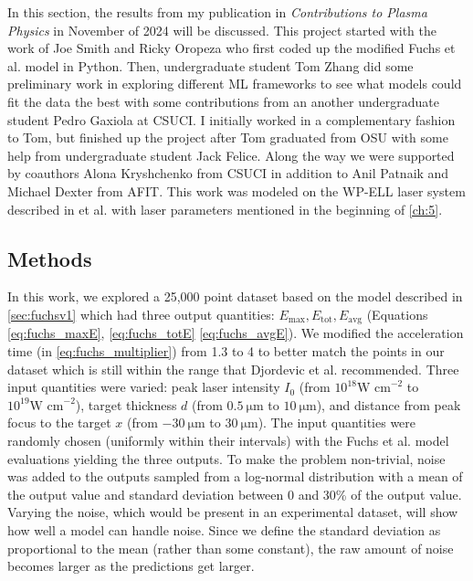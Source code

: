 In this section, the results from my publication in \emph{Contributions to Plasma Physics} \cite{Desai_2024_CPP} in November of 2024 will be discussed. This project started with the work of Joe Smith and Ricky Oropeza who first coded up the modified Fuchs et al. model in Python. Then, undergraduate student Tom Zhang did some preliminary work in exploring different \gls{ML} frameworks to see what models could fit the data the best with some contributions from an another undergraduate student Pedro Gaxiola at \gls{CSUCI}. I initially worked in a complementary fashion to Tom, but finished up the project after Tom graduated from OSU with some help from undergraduate student Jack Felice. Along the way we were supported by coauthors Alona Kryshchenko from \gls{CSUCI} in addition to Anil Patnaik and Michael Dexter from \gls{AFIT}. This work was modeled on the \gls{WP-ELL} laser system described in et al. \cite{George_2019_HPLSE} with laser parameters mentioned in the beginning of \autoref{ch:5}.

\subsection{Methods}
In this work, we explored a 25,000 point dataset based on the model described in \autoref{sec:fuchsv1} which had three output quantities: $E_\text{max}, E_\text{tot}, E_\text{avg}$ (Equations \ref{eq:fuchs_maxE}, \ref{eq:fuchs_totE} \ref{eq:fuchs_avgE}). We modified the acceleration time (in \autoref{eq:fuchs_multiplier}) from 1.3 to 4 to better match the points in our dataset which is still within the range that Djordevic et al. \cite{Djordjevic_2021_PPCF} recommended.  Three input quantities were varied: peak laser intensity $I_0$ (from  $10^{18} \text{W cm}^{-2}$ to $10^{19} \text{W cm}^{-2}$), target thickness $d$ (from $\SI{0.5}{\micro \meter}$ to $\SI{10}{\micro \meter}$), and distance from peak focus to the target $x$ (from $\SI{-30}{\micro \meter}$ to $\SI{30}{\micro \meter}$). The input quantities were randomly chosen (uniformly within their intervals) with the Fuchs et al. model evaluations yielding the three outputs. To make the problem non-trivial, noise was added to the outputs sampled from a log-normal distribution with a mean of the output value and standard deviation between 0 and 30\% of the output value. Varying the noise, which would be present in an experimental dataset, will show how well a model can handle noise. Since we define the standard deviation as proportional to the mean (rather than some constant), the raw amount of noise becomes larger as the predictions get larger.

